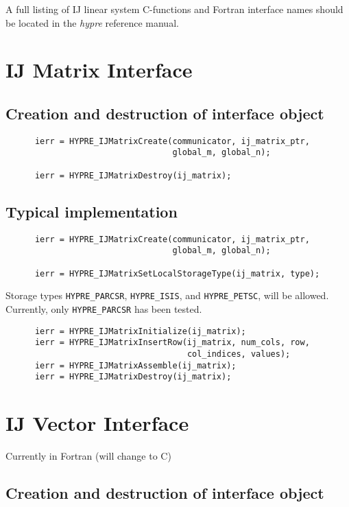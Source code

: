 A full listing of IJ linear system C-functions and Fortran
interface names should be located in the {\slshape hypre} reference
manual.

\section{IJ Matrix Interface}

\subsection{Creation and destruction of interface object}

\begin{verbatim}
      ierr = HYPRE_IJMatrixCreate(communicator, ij_matrix_ptr,
                                  global_m, global_n);

      ierr = HYPRE_IJMatrixDestroy(ij_matrix);
\end{verbatim}

\subsection{Typical implementation}

\begin{verbatim}
      ierr = HYPRE_IJMatrixCreate(communicator, ij_matrix_ptr,
                                  global_m, global_n);

      ierr = HYPRE_IJMatrixSetLocalStorageType(ij_matrix, type);
\end{verbatim}

\noindent Storage types \verb+HYPRE_PARCSR+, \verb+HYPRE_ISIS+, and
\verb+HYPRE_PETSC+, will be allowed.  Currently, only \verb+HYPRE_PARCSR+
has been tested. 

\begin{verbatim}
      ierr = HYPRE_IJMatrixInitialize(ij_matrix);
      ierr = HYPRE_IJMatrixInsertRow(ij_matrix, num_cols, row,
                                     col_indices, values);
      ierr = HYPRE_IJMatrixAssemble(ij_matrix);
      ierr = HYPRE_IJMatrixDestroy(ij_matrix);
\end{verbatim}

\section{IJ Vector Interface}

Currently in Fortran (will change to C)

\subsection{Creation and destruction of interface object}

